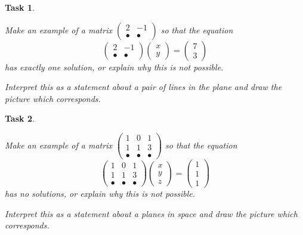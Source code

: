 \documentclass[10pt,]{book}
\theoremstyle{plain}
\numberwithin{equation}{section}
\newtheorem{task}{Task}[chapter]
\begin{document}
\begin{task}
\label{task-25}

          Make an example of a matrix \(\left( \begin{smallmatrix} 2 & -1 \\
          \bullet & \bullet \end{smallmatrix}\right)\) so that the equation\[
            \begin{pmatrix} 2 & -1 \\ \bullet & \bullet \end{pmatrix}
            \begin{pmatrix} x \\ y \end{pmatrix} = \begin{pmatrix} 7 \\ 3
            \end{pmatrix}
          \]
          has exactly one solution, or explain why this is not possible.
\par

          Interpret this as a statement about a pair of lines in the plane and
          draw the picture which corresponds.
\end{task}
\begin{task}
\label{task-26}

          Make an example of a matrix \(\left( \begin{smallmatrix} 1 & 0
          & 1\\ 1 & 1 & 3 \\ \bullet & \bullet & \bullet
          \end{smallmatrix}\right)\) so that the equation\[
            \begin{pmatrix} 1 & 0 & 1\\ 1 & 1 & 3 \\ \bullet
            & \bullet & \bullet \end{pmatrix}\begin{pmatrix} x \\ y \\ z
            \end{pmatrix} = \begin{pmatrix} 1 \\ 1 \\ 1 \end{pmatrix}
          \]
          has no solutions, or explain why this is not possible.
\par

          Interpret this as a statement about a planes in space and
          draw the picture which corresponds.
\end{task}
\end{document}

